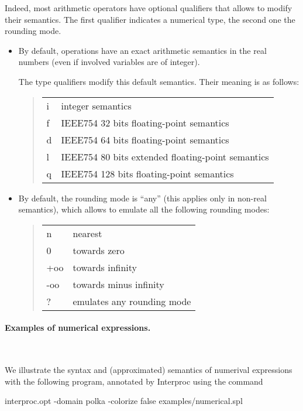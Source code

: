 \documentclass[a4paper,11pt]{article}
\begin{document}
Indeed, most arithmetic operators have optional qualifiers that
allows to modify their semantics. The first qualifier indicates a
numerical type, the second one the rounding mode.
\begin{itemize}
\item By default, operations have an exact arithmetic semantics in
  the real numbers (even if involved variables are of integer).

  The type qualifiers modify this default semantics.
  Their meaning is as follows:
  \begin{quote}
    \begin{tabular}{ll}
      i & integer semantics \\
      f & IEEE754 32 bits floating-point semantics \\
      d & IEEE754 64 bits floating-point semantics \\
      l & IEEE754 80 bits extended floating-point semantics \\
      q & IEEE754 128 bits floating-point semantics \\
    \end{tabular}
  \end{quote}

\item By default, the rounding mode is ``any'' (this applies only
  in non-real semantics), which allows to emulate all the
  following rounding modes:
  \begin{quote}
    \begin{tabular}{ll}
      n & nearest \\
      0 & towards zero \\
      +oo & towards infinity \\
      -oo & towards minus infinity \\
      ? & emulates any rounding mode
    \end{tabular}
  \end{quote}
\end{itemize}

\paragraph{Examples of numerical expressions.}\T~

We illustrate the syntax and (approximated) semantics of numerival
expressions with the following program, annotated by Interproc
using the command
\begin{example}
  interproc.opt -domain polka -colorize false examples/numerical.spl
\end{example}
\end{document}
